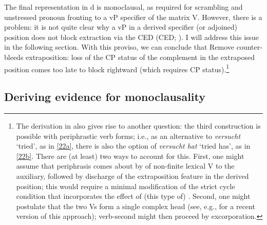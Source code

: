 \documentclass[output=paper]{langsci/langscibook}
\begin{document}
The final representation in d is monoclausal, as required for
scrambling and unstressed pronoun fronting to a vP specifier of the matrix V.
However, there is a problem: it is not quite clear why a vP in a derived
specifier (or adjoined) position does not block extraction via the
\glsdesc{CED} (\gls{CED};
\citealt{Huang:82,Chomsky:86,Cinque:90}).  I will address this issue in the
following section. With this proviso, we can conclude that Remove
counter-bleeds extraposition: loss of the CP status of the complement in the
extraposed position comes too late to block rightward  (which requires
CP status).\footnote{The derivation in  also gives rise to
    another question: the third construction is possible with periphrastic verb
    forms; i.e., as an alternative to {\itshape versucht} \enquote*{tried}, as in
    \eqref{22a}, there is also the option of {\itshape versucht hat} \enquote*{tried
    has}, as in \eqref{22b}. There are (at least) two ways to account for this.
    First, one might assume that periphrasis comes about by  of
    non-finite lexical V to the auxiliary, followed by discharge of the
    extraposition feature in the derived position; this would require a minimal
    modification of the strict cycle condition that incorporates the effect of
(this type of) . Second, one might postulate that the two Vs form
a single complex head (see, e.g., \citealt{Zwart:16} for a recent version of
this approach); verb-second  might then proceed  by excorporation.}

\subsection{Deriving evidence for monoclausality}
\end{document}
